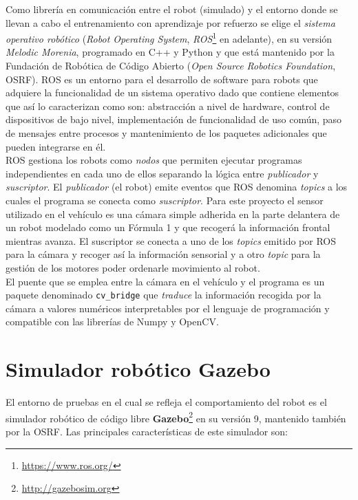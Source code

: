 Como librería en comunicación entre el robot (simulado) y el entorno donde se llevan a cabo el entrenamiento con aprendizaje por refuerzo se elige el \textit{sistema operativo robótico} (\textit{Robot Operating System}, \textit{ROS}\footnote{\url{https://www.ros.org/}} en adelante), en su versión \textit{Melodic Morenia}, programado en C++ y Python y que está mantenido por la Fundación de Robótica de Código Abierto (\textit{Open Source Robotics Foundation}, OSRF). ROS es un entorno para el desarrollo de software para robots que adquiere la funcionalidad de un sistema operativo dado que contiene elementos que así lo caracterizan como son: abstracción a nivel de hardware, control de dispositivos de bajo nivel, implementación de funcionalidad de uso común, paso de mensajes entre procesos y mantenimiento de los paquetes adicionales que pueden integrarse en él.\\

ROS gestiona los robots como \textit{nodos} que permiten ejecutar programas independientes en cada uno de ellos separando la lógica entre \textit{publicador} y \textit{suscriptor}. El \textit{publicador} (el robot) emite eventos que ROS denomina \textit{topics} a los cuales el programa se conecta como \textit{suscriptor}. Para este proyecto el sensor utilizado en el vehículo es una cámara simple adherida en la parte delantera de un robot modelado como un Fórmula 1 y que recogerá la información frontal mientras avanza. El suscriptor se conecta a uno de los \textit{topics} emitido por ROS para la cámara y recoger así la información sensorial y a otro \textit{topic} para la gestión de los motores poder ordenarle movimiento al robot.\\

El puente que se emplea entre la cámara en el vehículo y el programa es un paquete denominado \texttt{cv\_bridge} que \textit{traduce} la información recogida por la cámara a valores numéricos interpretables por el lenguaje de programación y compatible con las librerías de Numpy y OpenCV.\\

\section{Simulador robótico Gazebo}

El entorno de pruebas en el cual se refleja el comportamiento del robot es el simulador robótico de código libre \textbf{Gazebo}\footnote{\url{http://gazebosim.org}} en su versión 9, mantenido también por la OSRF. Las principales características de este simulador son:\\

